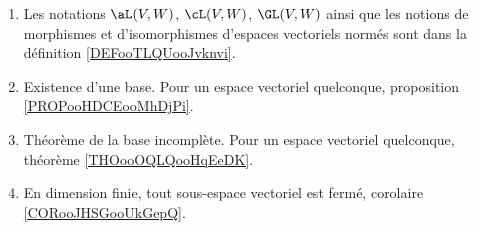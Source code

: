 	\label{THEMEooVectoriels}

\begin{enumerate}
	\item
	      Les notations \( \aL(V,W)\), \( \cL(V,W)\), \( \GL(V,W)\) ainsi que les notions de morphismes et d'isomorphismes d'espaces vectoriels normés sont dans la définition \ref{DEFooTLQUooJvknvi}.
	\item
	      Existence d'une base. Pour un espace vectoriel quelconque, proposition \ref{PROPooHDCEooMhDjPi}.
	\item
	      Théorème de la base incomplète. Pour un espace vectoriel quelconque, théorème \ref{THOooOQLQooHqEeDK}.
	\item
	      En dimension finie, tout sous-espace vectoriel est fermé, corolaire \ref{CORooJHSGooUkGepQ}.
\end{enumerate}
